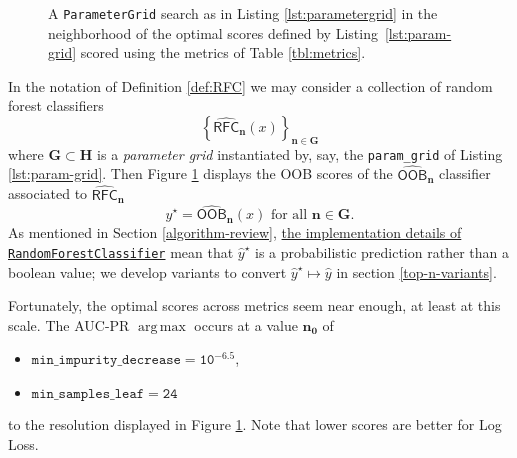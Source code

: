 \documentclass[11pt]{article}
\DeclareMathOperator*{\argmax}{arg\,max}
\theoremstyle{definition}
\numberwithin{equation}{section}
\begin{document}
\begin{figure}[p]
\centering
{}
\caption[\texttt{ParameterGrid} search in optimal neighborhood]{A \texttt{ParameterGrid} search as in Listing \ref{lst:parametergrid} in the neighborhood of the optimal scores defined by Listing~{\ref{lst:param-grid}} scored using the metrics of Table \ref{tbl:metrics}.
}
\label{fig:best-scores}
\end{figure}



In the notation of Definition \ref{def:RFC} %
we may consider a collection of random forest classifiers 
\begin{equation}
\left\{ \operatorname{\widehat{\mathsf{RFC}}}_\mathbf{n} (x) \right\}_{\mathbf{n} \in \mathbf{G}}
\end{equation}
where $\mathbf{G} \subset \mathbf{H}$ is a \emph{parameter grid} instantiated by, say, the \texttt{param\_grid} of Listing \ref{lst:param-grid}.
Then Figure \ref{fig:best-scores} displays the OOB scores of the $\operatorname{\widehat{\mathsf{OOB}}}_\mathbf{n}$ classifier
associated to $\operatorname{\widehat{\mathsf{RFC}}}_\mathbf{n}$
\begin{equation}\label{eq:RFCn}
\hat{y}^{\star} = \operatorname{\widehat{\mathsf{OOB}}}_\mathbf{n} (x) \text{ for all } \mathbf{n} \in \mathbf{G}.
\end{equation}
As mentioned in Section \ref{algorithm-review}, 
\href{https://scikit-learn.org/stable/modules/ensemble.html\#random-forests}{the
implementation details of \texttt{RandomForestClassifier}}
mean that $\hat{y}^\star$ is a probabilistic prediction rather than a boolean value; we develop variants to convert $\hat{y}^\star \mapsto \hat{y}$ in section \ref{top-n-variants}.








Fortunately, the optimal scores across metrics seem near enough, at least at this scale. 
The AUC-PR $\argmax$ occurs at a value $\mathbf{n_0}$ of
\begin{itemize}
\item $\mathtt{min\_impurity\_decrease = 10^{-6.5}}$,
\item $\mathtt{min\_samples\_leaf = 24}$
\end{itemize}
to the resolution displayed in Figure \ref{fig:best-scores}. 
Note that lower scores are better for Log Loss.
\end{document}
